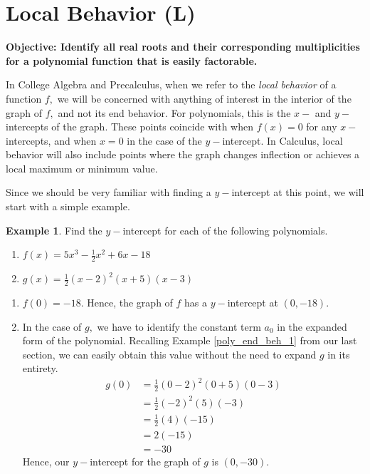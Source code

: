 \documentclass[12pt]{book}
\theoremstyle{definition}
\newtheorem{example}{Example}
\begin{document}
\section{Local Behavior (L)}
{\bf Objective: Identify all real roots and their corresponding multiplicities for a polynomial function that is easily factorable.}\par
In College Algebra and Precalculus, when we refer to the {\it local behavior} of a function $f,$ we will be concerned with anything of interest in the interior of the graph of $f,$ and not its end behavior.  For polynomials, this is the $x-$ and $y-$intercepts of the graph.  These points coincide with when $f(x)=0$ for any $x-$intercepts, and when $x=0$ in the case of the $y-$intercept.  In Calculus, local behavior will also include points where the graph changes inflection or achieves a local maximum or minimum value. 
\par
Since we should be very familiar with finding a $y-$intercept at this point, we will start with a simple example.
\begin{example}
Find the $y-$intercept for each of the following polynomials.
\begin{multicols}{2}
\begin{enumerate}
\item $f(x)=5x^3-\frac{1}{2}x^2+6x-18$
\item $g(x)=\frac{1}{2}(x-2)^2(x+5)(x-3)$
\end{enumerate}
\end{multicols}
\begin{enumerate}
\item $f(0)=-18.$  Hence, the graph of $f$ has a $y-$intercept at $(0,-18)$.
\item In the case of $g,$ we have to identify the constant term $a_0$ in the expanded form of the polynomial. Recalling Example \ref{poly_end_beh_1} from our last section, we can easily obtain this value without the need to expand $g$ in its entirety.
\begin{equation*}
\begin{split}
g(0) & =\frac{1}{2}(0-2)^2(0+5)(0-3)\\
&= \frac{1}{2}(-2)^2(5)(-3)\\
&= \frac{1}{2}(4)(-15)\\
&= 2(-15)\\
&= -30
\end{split}
\end{equation*}
Hence, our $y-$intercept for the graph of $g$ is $(0,-30)$.
\end{enumerate}
\end{example}
\end{document}
